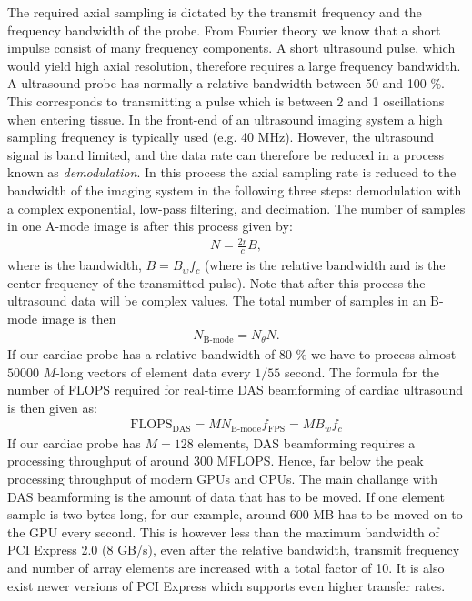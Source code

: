 The required axial sampling is dictated by the transmit frequency and the frequency bandwidth of the probe. From Fourier theory we know that a short impulse consist of many frequency components. A short ultrasound pulse, which would yield high axial resolution, therefore requires a large frequency bandwidth. A ultrasound probe has normally a relative bandwidth between 50 and 100 \%. This corresponds to transmitting a pulse which is between 2 and 1 oscillations when entering tissue. In the front-end of an ultrasound imaging system a high sampling frequency is typically used (e.g. 40 MHz). However, the ultrasound signal is band limited, and the data rate can therefore be reduced in a process known as \textit{ demodulation}. In this process the axial sampling rate is reduced to the bandwidth of the imaging system in the following three steps: demodulation with a complex exponential, low-pass filtering, and decimation. The number of samples in one A-mode image is after this process given by:
\begin{align}
N = \frac{2r}{c}B,
\end{align}
where  is the bandwidth, $B = B_wf_c$ (where  is the relative bandwidth and  is the center frequency of the transmitted pulse). Note that after this process the ultrasound data will be complex values. The total number of samples in an B-mode image is then 
\begin{align}
N_{\text{B-mode}} = N_\theta N.
\end{align}
If our cardiac probe has a relative bandwidth of $80$ \% we have to process almost $50000$ $M$-long vectors of element data every $1/55$ second. The formula for the number of FLOPS required for real-time DAS beamforming of cardiac ultrasound is then given as:
\begin{align}
\text{FLOPS}_{\text{DAS}} = MN_{\text{B-mode}}f_{\text{FPS}} = MB_wf_c
\end{align}
If our cardiac probe has $M=128$ elements, DAS beamforming requires a processing throughput of around $300$ MFLOPS. Hence, far below the peak processing throughput of modern GPUs and CPUs. The main challange with DAS beamforming is the amount of data that has to be moved. If one element sample is two bytes long, for our example, around 600 MB has to be moved on to the GPU every second. This is however less than the maximum bandwidth of PCI Express 2.0 (8 GB/s), even after the relative bandwidth, transmit frequency and number of array elements are increased with a total factor of 10. It is also exist newer versions of PCI Express which supports even higher transfer rates.

